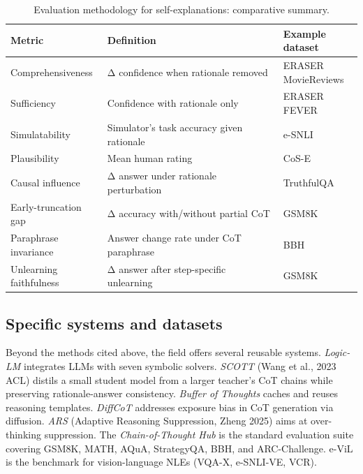 \documentclass{article}
\begin{document}
\begin{table}[t]
\centering
\caption{Evaluation methodology for self-explanations: comparative summary.}
\label{tab:evaluation-methodology-for-self-explanations}
\begin{tabular}{>{\raggedright\arraybackslash}p{0.2771\linewidth}
  >{\raggedright\arraybackslash}p{0.4940\linewidth}
  >{\raggedright\arraybackslash}p{0.2289\linewidth}}
\toprule
Metric & Definition & Example dataset \\
\midrule
Comprehensiveness & Δ confidence when rationale removed & ERASER MovieReviews \\
Sufficiency & Confidence with rationale only & ERASER FEVER \\
Simulatability & Simulator's task accuracy given rationale & e-SNLI \\
Plausibility & Mean human rating & CoS-E \\
Causal influence & Δ answer under rationale perturbation & TruthfulQA \\
Early-truncation gap & Δ accuracy with/without partial CoT & GSM8K \\
Paraphrase invariance & Answer change rate under CoT paraphrase & BBH \\
Unlearning faithfulness & Δ answer after step-specific unlearning & GSM8K \citep{tutek2025measuringchainofth} \\
\end{tabular}
\end{table}

\subsection{Specific systems and datasets}\label{specific-systems-and-datasets}

Beyond the methods cited above, the field offers several reusable systems. \emph{Logic-LM} \citep{pan2023logiclmempoweringl} integrates LLMs with seven symbolic solvers. \emph{SCOTT} (Wang et al., 2023 ACL) distils a small student model from a larger teacher's CoT chains while preserving rationale-answer consistency. \emph{Buffer of Thoughts} \citep{yang2024bufferofthoughtsth} caches and reuses reasoning templates. \emph{DiffCoT} \citep{cao2026diffcotdiffusionst} addresses exposure bias in CoT generation via diffusion. \emph{ARS} (Adaptive Reasoning Suppression, Zheng 2025) aims at over-thinking suppression. The \emph{Chain-of-Thought Hub} \citep{fu2023chainofthoughthuba} is the standard evaluation suite covering GSM8K, MATH, AQuA, StrategyQA, BBH, and ARC-Challenge. e-ViL \citep{kayser2021eviladatasetandben} is the benchmark for vision-language NLEs (VQA-X, e-SNLI-VE, VCR).
\end{document}
